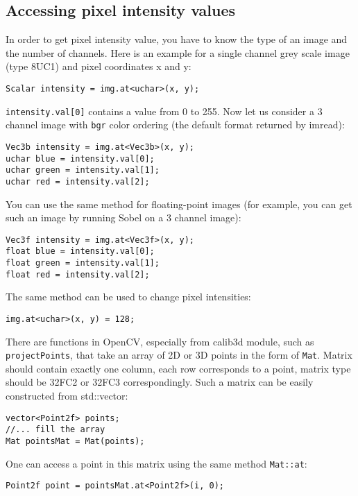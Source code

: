 \subsection{Accessing pixel intensity values}
In order to get pixel intensity value, you have to know the type of an image and the number of channels. Here is an example for a single channel grey scale image (type 8UC1) and pixel coordinates x and y:
\begin{lstlisting}
Scalar intensity = img.at<uchar>(x, y);
\end{lstlisting}
\texttt{intensity.val[0]} contains a value from 0 to 255. 
Now let us consider a 3 channel image with \texttt{bgr} color ordering (the default format returned by imread):
\begin{lstlisting}
Vec3b intensity = img.at<Vec3b>(x, y);
uchar blue = intensity.val[0];
uchar green = intensity.val[1];
uchar red = intensity.val[2];
\end{lstlisting}
You can use the same method for floating-point images (for example, you can get such an image by running Sobel on a 3 channel image):
\begin{lstlisting}
Vec3f intensity = img.at<Vec3f>(x, y);
float blue = intensity.val[0];
float green = intensity.val[1];
float red = intensity.val[2];
\end{lstlisting}
The same method can be used to change pixel intensities:
\begin{lstlisting}
img.at<uchar>(x, y) = 128;
\end{lstlisting}


There are functions in OpenCV, especially from calib3d module, such as \texttt{projectPoints}, that take an array of 2D or 3D points in the form of \texttt{Mat}. Matrix should contain exactly one column, each row corresponds to a point, matrix type should be 32FC2 or 32FC3 correspondingly. Such a matrix can be easily constructed from std::vector:
\begin{lstlisting}
vector<Point2f> points;
//... fill the array
Mat pointsMat = Mat(points);
\end{lstlisting}
One can access a point in this matrix using the same method \texttt{Mat::at}:
\begin{lstlisting}
Point2f point = pointsMat.at<Point2f>(i, 0);
\end{lstlisting}

